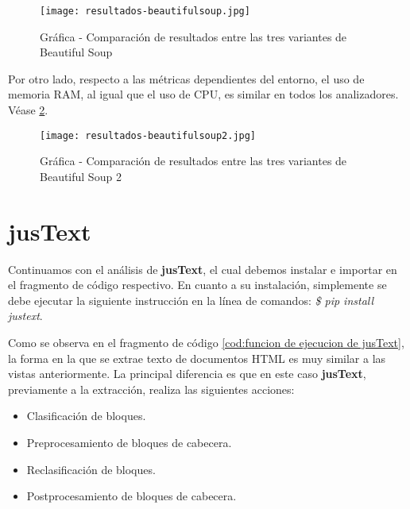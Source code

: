 \begin{figure}[tphb]
    \centering
    \texttt{[image: resultados-beautifulsoup.jpg]}
    \caption{Gráfica - Comparación de resultados entre las tres variantes de Beautiful Soup}
    \label{img:grafica - comparacion de resultados entre las variantes de beautiful soup}
\end{figure}

Por otro lado, respecto a las métricas dependientes del entorno, el uso de memoria RAM, al igual que el uso
de CPU, es similar en todos los analizadores. Véase \ref{img:grafica - comparacion de resultados entre las variantes de beautiful soup 2}.

\begin{figure}[tphb]
    \centering
    \texttt{[image: resultados-beautifulsoup2.jpg]}
    \caption{Gráfica - Comparación de resultados entre las tres variantes de Beautiful Soup 2}
    \label{img:grafica - comparacion de resultados entre las variantes de beautiful soup 2}
\end{figure}

\section*{jusText}

Continuamos con el análisis de \textbf{jusText}, el cual debemos instalar e importar en el fragmento de 
código respectivo. En cuanto a su instalación, simplemente se debe ejecutar la siguiente instrucción en la 
línea de comandos: \emph{\$ pip install justext}.

Como se observa en el fragmento de código \ref{cod:funcion de ejecucion de jusText}, la forma en la que
se extrae texto de documentos HTML es muy similar a las vistas anteriormente. La principal diferencia es
que en este caso \textbf{jusText}, previamente a la extracción, realiza las siguientes acciones:

\begin{itemize}
    \item Clasificación de bloques.
    \item Preprocesamiento de bloques de cabecera.
    \item Reclasificación de bloques.
    \item Postprocesamiento de bloques de cabecera.
\end{itemize}

\begin{codefloat}
    
    \caption{Función de ejecución de jusText}
    \label{cod:funcion de ejecucion de jusText}
\end{codefloat}

